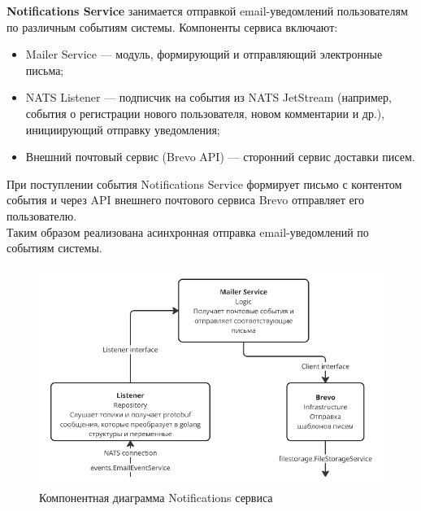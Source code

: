 \textbf{Notifications Service} занимается отправкой email-уведомлений пользователям по различным событиям системы. Компоненты сервиса включают:
\begin{itemize}
    \item Mailer Service — модуль, формирующий и отправляющий электронные письма;
    \item NATS Listener — подписчик на события из NATS JetStream (например, события о регистрации нового пользователя, новом комментарии и др.), инициирующий отправку уведомления;
    \item Внешний почтовый сервис (Brevo API) — сторонний сервис доставки писем.
\end{itemize}
\noindent При поступлении события Notifications Service формирует письмо с контентом события и через API внешнего почтового сервиса Brevo отправляет его пользователю. \\ Таким образом реализована асинхронная отправка email-уведомлений по событиям системы.
\begin{figure}[H]
        \centering
        \includegraphics[width=0.8\linewidth]{Images/second_chapter_backend_architecture/Picture7.png}
        \caption{Компонентная диаграмма Notifications сервиса}
        \label{fig:notifications-service-component-diagram}
\end{figure}

